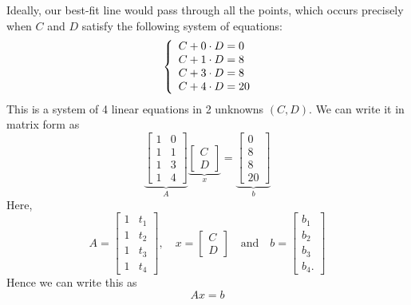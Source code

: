 \documentclass[10pt]{article}
\theoremstyle{definition}
\newcommand{\1}[1]{\textbf{1}_{\left[#1\right]}} %
\begin{document}
Ideally, our best-fit line would pass through all the points, which occurs
precisely when $C$ and $D$ satisfy the following system of equations:
\begin{equation*}
  \left\{ \begin{array}{l@{}l}
      C+0\cdot D=0 \\
      C+1\cdot D=8 \\
      C+3\cdot D=8 \\
      C+4\cdot D=20 \\
    \end{array}\right.
\end{equation*}
This is a system of 4 linear equations in 2 unknowns $(C,D)$. We can write it
in matrix form as
\begin{equation*}
  \underbrace{\begin{bmatrix}
    1&0\\
    1&1\\
    1&3\\
    1&4
  \end{bmatrix}}_{A}
  \underbrace{\begin{bmatrix}
    C\\D
  \end{bmatrix}}_{x}
  =
  \underbrace{\begin{bmatrix}
    0\\8\\8\\20
  \end{bmatrix}}_{b}
\end{equation*}
Here,
\begin{equation*}
  A=
  \begin{bmatrix}
    1&t_{1}\\
    1&t_{2}\\
    1&t_{3}\\
    1&t_{4}
  \end{bmatrix},
  \quad
  x =
  \begin{bmatrix}
    C\\D
  \end{bmatrix}
  \quad \text{and} \quad
  b=
  \begin{bmatrix}
    b_{1}\\b_{2}\\b_{3}\\b_{4}.
  \end{bmatrix}
\end{equation*}
Hence we can write this as
\begin{equation*}
  Ax=b
\end{equation*}
\end{document}
